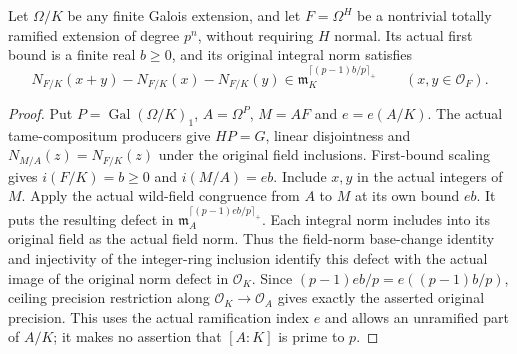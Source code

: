 \begin{lemma}
\label{fw:tame-norm-addition-descent}
\leanok
Let $\Omega/K$ be any finite Galois extension, and let
$F=\Omega^H$ be a nontrivial totally ramified extension of degree
$p^n$, without requiring $H$ normal. Its actual first bound is a
finite real $b\geq0$, and its original integral norm satisfies
\[
 N_{F/K}(x+y)-N_{F/K}(x)-N_{F/K}(y)
 \in\mathfrak m_K^{\lceil(p-1)b/p\rceil_+}
 \qquad(x,y\in\mathcal O_F).
\]
\end{lemma}
\begin{proof}
Put $P=\operatorname{Gal}(\Omega/K)_1$, $A=\Omega^P$,
$M=AF$ and $e=e(A/K)$. The actual tame-compositum producers
give $HP=G$, linear disjointness and
$N_{M/A}(z)=N_{F/K}(z)$ under the original field inclusions.
First-bound scaling gives $i(F/K)=b\geq0$ and $i(M/A)=eb$.
Include $x,y$ in the actual integers of $M$. Apply the actual
wild-field congruence from $A$ to $M$ at its own bound $eb$.
It puts the resulting defect in
$\mathfrak m_A^{\lceil(p-1)eb/p\rceil_+}$.
Each integral norm includes into its original field as the actual
field norm. Thus the field-norm base-change identity and
injectivity of the integer-ring inclusion identify this defect
with the actual image of the original norm defect in
$\mathcal O_K$. Since $(p-1)eb/p=e((p-1)b/p)$, ceiling precision
restriction along $\mathcal O_K\longrightarrow\mathcal O_A$
gives exactly the asserted original precision. This uses the
actual ramification index $e$ and allows an unramified part of
$A/K$; it makes no assertion that $[A:K]$ is prime to $p$.
\end{proof}

